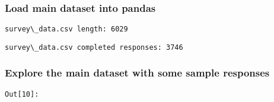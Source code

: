 \documentclass[11pt]{article}
\begin{document}
    \subsubsection{Load main dataset into
pandas}\label{load-main-dataset-into-pandas}




    \begin{Verbatim}[commandchars=\\\{\}]
survey\_data.csv length: 6029

    \end{Verbatim}


    \begin{Verbatim}[commandchars=\\\{\}]
survey\_data.csv completed responses: 3746

    \end{Verbatim}

    \subsubsection{Explore the main dataset with some sample
responses}\label{explore-the-main-dataset-with-some-sample-responses}

\texttt{\color{outcolor}Out[{\color{outcolor}10}]:}
    
\end{document}
